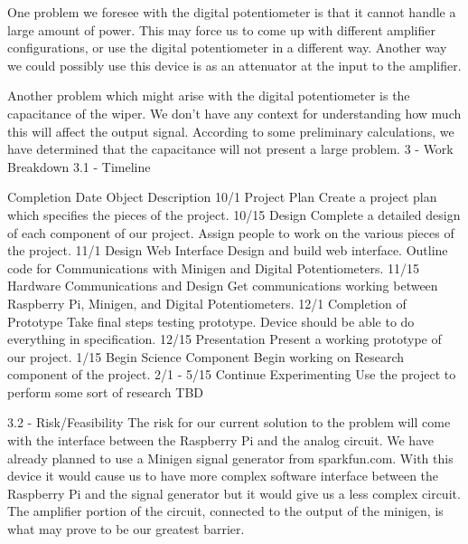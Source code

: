 \documentclass{article}	%
\begin{document}
\begin{multicols}{2}
One problem we foresee with the digital potentiometer is that it cannot handle a large amount of power. This may force us to come up with different amplifier configurations, or use the digital potentiometer in a different way. Another way we could possibly use this device is as an attenuator at the input to the amplifier.

Another problem which might arise with the digital potentiometer is the capacitance of the wiper. We don’t have any context for understanding how much this will affect the output signal. According to some preliminary calculations, we have determined that the capacitance will not present a large problem.
3 - Work Breakdown
3.1 - Timeline

Completion Date
Object
Description
10/1
Project Plan
Create a project plan which specifies the pieces of the project.
10/15
Design
Complete a detailed design of each component of our project. Assign people to work on the various pieces of the project.
11/1
Design Web Interface
Design and build web interface. Outline code for Communications with Minigen and Digital Potentiometers.
11/15
Hardware Communications and Design
Get communications working between Raspberry Pi, Minigen, and Digital Potentiometers.
12/1
Completion of Prototype
Take final steps testing prototype. Device should be able to do everything in specification.
12/15
Presentation
Present a working prototype of our project.
1/15
Begin Science Component
Begin working on Research component of the project.
2/1 - 5/15
Continue Experimenting
Use the project to perform some sort of research TBD

3.2 - Risk/Feasibility
The risk for our current solution to the problem will come with the interface between the Raspberry Pi and the analog circuit. We have already planned to use a Minigen signal generator from sparkfun.com. With this device it would cause us to have more complex software interface between the Raspberry Pi and the signal generator but it would give us a less complex circuit. The amplifier portion of the circuit, connected to the output of the minigen, is what may prove to be our greatest barrier.


\end{multicols}
\end{document}

